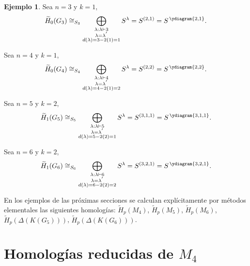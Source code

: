 \documentclass[12pt]{book}
\theoremstyle{definition}
\newtheorem{example}[theorem]{Ejemplo}
\newcounter{in}
\begin{document}
\begin{example}
  \quad

  Sea $n=3$ y $k=1$, 
  \begin{equation*}
    \widetilde H_{0}(G_{3})\cong_{S_{3}}\bigoplus_{\substack{\lambda:\lambda\vdash 3\\
        \lambda=\lambda^{'}\\d(\lambda)=3-2(1)=1}} S^{\lambda}=S^{(2,1)}=S^{\,\ydiagram{2,1}}.
  \end{equation*}
          
  Sea $n=4$ y $k=1$,
  \begin{equation*}
    \widetilde H_{0}(G_{4})\cong_{S_{4}}\bigoplus_{\substack{\lambda:\lambda\vdash 4\\
        \lambda=\lambda^{'}\\d(\lambda)=4-2(1)=2}} S^{\lambda}=S^{(2,2)}=S^{\,\ydiagram{2,2}}.
  \end{equation*}

  Sea $n=5$ y $k=2$,
  \begin{equation*}
    \widetilde H_{1}(G_{5})\cong_{S_{5}}\bigoplus_{\substack{\lambda:\lambda\vdash 5\\
        \lambda=\lambda^{'}\\d(\lambda)=5-2(2)=1}} S^{\lambda}=S^{(3,1,1)}=S^{\,\ydiagram{3,1,1}}.
  \end{equation*}
        
  Sea $n=6$ y $k=2$,
  \begin{equation*}
    \widetilde H_{1}(G_{6})\cong_{S_{6}}\bigoplus_{\substack{\lambda:\lambda\vdash 6\\
        \lambda=\lambda^{'}\\d(\lambda)=6-2(2)=2}} S^{\lambda}=S^{(3,2,1)}=S^{\,\ydiagram{3,2,1}}.
  \end{equation*}
\end{example}

En los ejemplos de las próximas secciones se calculan explícitamente
por métodos elementales las siguientes homologías: $\widetilde
H_{p}(M_{4})$, $\widetilde H_{p}(M_{5})$, $\widetilde H_{p}(M_{6})$,
$\widetilde H_{p}(\Delta(K(G_{5})))$, $\widetilde H_{p}(\Delta(K(G_{6})))$.

\section{Homologías reducidas de $M_{4}$}
\label{hom-red-M4}
\end{document}
